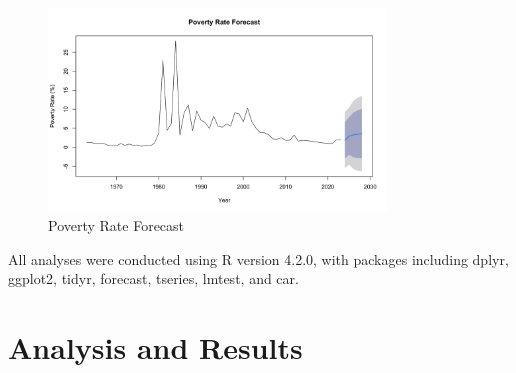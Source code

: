\documentclass[12pt,a4paper]{article}
\begin{document}
\begin{enumerate}
    \begin{figure}[h]
    \centering
    \includegraphics[width=0.8\textwidth]{../output/visualizations/poverty_forecast.png}
    \caption{Poverty Rate Forecast}
    \end{figure}
\end{enumerate}

All analyses were conducted using R version 4.2.0, with packages including dplyr, ggplot2, tidyr, forecast, tseries, lmtest, and car.

\section{Analysis and Results}\label{sec:results}
\end{document}
